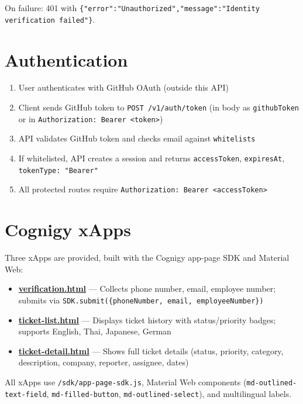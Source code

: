 \documentclass{article}
\begin{document}
On failure: 401 with \texttt{\{"error":"Unauthorized","message":"Identity verification failed"\}}.

\section{Authentication}

\begin{enumerate}[noitemsep]
  \item User authenticates with GitHub OAuth (outside this API)
  \item Client sends GitHub token to \texttt{POST /v1/auth/token} (in body as \texttt{githubToken} or in \texttt{Authorization: Bearer <token>})
  \item API validates GitHub token and checks email against \texttt{whitelists}
  \item If whitelisted, API creates a session and returns \texttt{accessToken}, \texttt{expiresAt}, \texttt{tokenType: "Bearer"}
  \item All protected routes require \texttt{Authorization: Bearer <accessToken>}
\end{enumerate}

\section{Cognigy xApps}

Three xApps are provided, built with the Cognigy app-page SDK and Material Web:

\begin{itemize}[noitemsep]
  \item \href{https://github.com/boss-spicyz100x/intracore/blob/main/xapps/verification.html}{\textbf{verification.html}} --- Collects phone number, email, employee number; submits via \texttt{SDK.submit(\{phoneNumber, email, employeeNumber\})}
  \item \href{https://github.com/boss-spicyz100x/intracore/blob/main/xapps/ticket-list.html}{\textbf{ticket-list.html}} --- Displays ticket history with status/priority badges; supports English, Thai, Japanese, German
  \item \href{https://github.com/boss-spicyz100x/intracore/blob/main/xapps/ticket-detail.html}{\textbf{ticket-detail.html}} --- Shows full ticket details (status, priority, category, description, company, reporter, assignee, dates)
\end{itemize}

All xApps use \texttt{/sdk/app-page-sdk.js}, Material Web components (\texttt{md-outlined-text-field}, \texttt{md-filled-button}, \texttt{md-outlined-select}), and multilingual labels.
\end{document}
